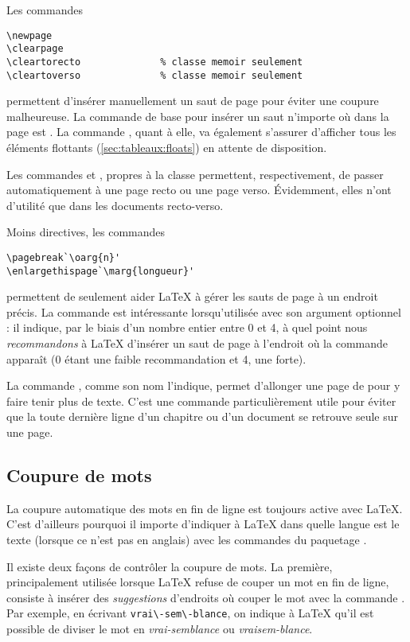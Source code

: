 Les commandes
\begin{lstlisting}
\newpage
\clearpage
\cleartorecto              % classe memoir seulement
\cleartoverso              % classe memoir seulement
\end{lstlisting}
permettent d'insérer manuellement un saut de page pour éviter une
coupure malheureuse. La commande de base pour insérer un saut
n'importe où dans la page est \cmd{\newpage}. La commande
\cmd{\clearpage}, quant à elle, va également s'assurer d'afficher tous
les éléments flottants (\autoref{sec:tableaux:floats}) en attente de
disposition.

Les commandes \cmd{\cleartorecto} et \cmd{\cleartoverso}, propres à la
classe  permettent, respectivement, de passer
automatiquement à une page recto ou une page verso. Évidemment, elles
n'ont d'utilité que dans les documents recto-verso.

Moins directives, les commandes
\begin{lstlisting}
\pagebreak`\oarg{n}'
\enlargethispage`\marg{longueur}'
\end{lstlisting}
permettent de seulement aider {\LaTeX} à gérer les sauts de page à un
endroit précis. La commande \cmd{\pagebreak} est intéressante
lorsqu'utilisée avec son argument optionnel : il indique, par
le biais d'un nombre entier entre 0 et 4, à quel point nous
\emph{recommandons} à {\LaTeX} d'insérer un saut de page à l'endroit
où la commande apparaît (0 étant une faible recommandation et 4, une
forte).

La commande \cmd{\enlargethispage}, comme son nom l'indique, permet
d'allonger une page de  pour y faire tenir plus de
texte. C'est une commande particulièrement utile pour éviter que la
toute dernière ligne d'un chapitre ou d'un document se retrouve seule sur
une page.

\subsection{Coupure de mots}
\label{sec:trucs:controle:coupure}

La coupure automatique des mots en fin de ligne est toujours active
avec {\LaTeX}. C'est d'ailleurs pourquoi il importe d'indiquer à
{\LaTeX} dans quelle langue est le texte (lorsque ce n'est pas en
anglais) avec les commandes du paquetage .

Il existe deux façons de contrôler la coupure de mots. La première,
principalement utilisée lorsque {\LaTeX} refuse de couper un mot en
fin de ligne, consiste à insérer des \emph{suggestions} d'endroits où
couper le mot avec la commande \cmd{\-}. Par exemple, en écrivant
\verb=vrai\-sem\-blance=, on indique à {\LaTeX} qu'il est possible de
diviser le mot en \emph{vrai-semblance} ou \emph{vraisem-blance}.

